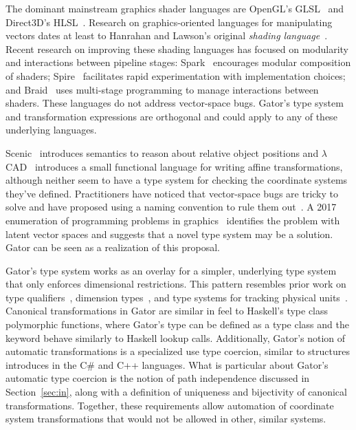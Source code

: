 {The dominant mainstream graphics shader languages are OpenGL's GLSL~\cite{glsl} and Direct3D's HLSL~\cite{direct3d}.
Research on graphics-oriented languages for manipulating vectors dates at least to Hanrahan and Lawson's original \emph{shading language}~\cite{hanrahan90}.
Recent research on improving these shading languages has focused on modularity and interactions between pipeline stages:
Spark~\cite{spark} encourages modular composition of shaders;
Spire~\cite{spire} facilitates rapid experimentation with implementation choices;
and Braid~\cite{braid} uses multi-stage programming to manage interactions between shaders.
These languages do not address vector-space bugs.
Gator's type system and transformation expressions are orthogonal and could apply to any of these underlying languages.

Scenic~\cite{spatial} introduces semantics to reason about relative object positions and $\lambda$CAD~\cite{acad} introduces a small functional language for writing affine transformations, although neither seem to have a type system for checking the coordinate systems they've defined.
Practitioners have noticed that vector-space bugs are tricky to solve and have proposed using a naming convention to rule them out~\cite{naming}.
A 2017 enumeration of programming problems in graphics~\cite{lfogl} identifies the problem with latent vector spaces and suggests that a novel type system may be a solution.
Gator can be seen as a realization of this proposal.

Gator's type system works as an overlay for a simpler, underlying type system that only enforces dimensional restrictions.
This pattern resembles prior work on type qualifiers~\cite{cqual}, dimension types~\cite{dimension}, and type systems for tracking physical units~\cite{unit}.
Canonical transformations in Gator are similar in feel to Haskell's type class polymorphic functions, where Gator's  type can be defined as a type class and the  keyword behave similarly to Haskell lookup calls.
Additionally, Gator's notion of automatic transformations is a specialized use type coercion, similar to structures introduces in the C\# and C++ languages.
What is particular about Gator's automatic type coercion is the notion of path independence discussed in Section~\ref{sec:in}, along with a definition of uniqueness and bijectivity of canonical transformations. Together, these requirements allow automation of coordinate system transformations that would not be allowed in other, similar systems.

}
